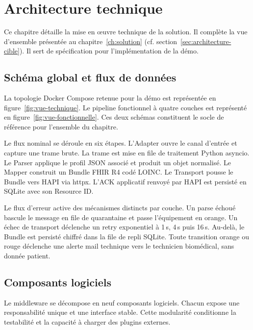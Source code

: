 \chapter{Architecture technique}
\label{ch:architecture-technique}

Ce chapitre détaille la mise en \oe uvre technique de la solution. Il complète la vue d'ensemble présentée au chapitre~\ref{ch:solution} (cf. section~\ref{sec:architecture-cible}). Il sert de spécification pour l'implémentation de la démo.

\section{Schéma global et flux de données}
\label{sec:archi-schema-global}

La topologie Docker Compose retenue pour la démo est représentée en figure~\ref{fig:vue-technique}. Le pipeline fonctionnel à quatre couches est représenté en figure~\ref{fig:vue-fonctionnelle}. Ces deux schémas constituent le socle de référence pour l'ensemble du chapitre.

Le flux nominal se déroule en six étapes. L'Adapter ouvre le canal d'entrée et capture une trame brute. La trame est mise en file de traitement Python asyncio. Le Parser applique le profil JSON associé et produit un objet normalisé. Le Mapper construit un Bundle FHIR R4 codé LOINC. Le Transport pousse le Bundle vers HAPI via httpx. L'ACK applicatif renvoyé par HAPI est persisté en SQLite avec son Resource ID.

Le flux d'erreur active des mécanismes distincts par couche. Un parse échoué bascule le message en file de quarantaine et passe l'équipement en orange. Un échec de transport déclenche un retry exponentiel à 1\,s, 4\,s puis 16\,s. Au-delà, le Bundle est persisté chiffré dans la file de repli SQLite. Toute transition orange ou rouge déclenche une alerte mail technique vers le technicien biomédical, sans donnée patient.

\section{Composants logiciels}
\label{sec:archi-composants}

Le middleware se décompose en neuf composants logiciels. Chacun expose une responsabilité unique et une interface stable. Cette modularité conditionne la testabilité et la capacité à charger des plugins externes.

